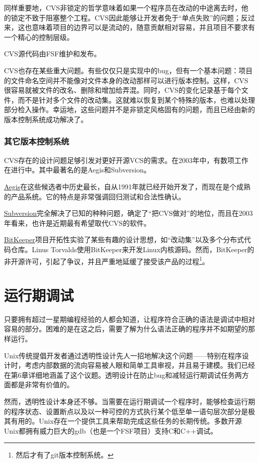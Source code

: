\documentclass[12pt,oneside]{ctexbook}
\begin{document}
\begin{common-format}
同样重要地，CVS非锁定的哲学意味着如果一个程序员在改动的中途离去时，他的锁定不致于阻塞整个工程。CVS因此能够让开发者免于“单点失败”的问题；反过来，这也意味着项目的边界可以是流动的，随意贡献相对容易，并且项目不要求有一个精心的控制层级。

CVS源代码由FSF维护和发布。

CVS也存在某些重大问题。有些仅仅只是实现中的bug，但有一个基本问题：项目的文件命名空间并不能像对文件本身的改动那样可以进行版本控制。这样，CVS很容易就被文件的改名、删除和增加给弄混。同时，CVS的变化记录基于每个文件，而不是针对多个文件的改动集。这就难以恢复到某个特殊的版本，也难以处理部分检入操作。幸运地，这些问题并不是非锁定风格固有的问题，而且已经由新的版本控制系统成功解决了。

\subsubsection{其它版本控制系统}
CVS存在的设计问题足够引发对更好开源VCS的需求。在2003年中，有数项工作在进行中。其中最著名的是Aegis和Subversion。

\href{http://www.pcug.org.au/~millerp/aegis/aegis.html}{Aegis}在这些候选者中历史最长，自从1991年就已经开始开发了，而现在是个成熟的产品系统。它的特点是非常强调回归测试和合法性确认。

\href{http://subversion.tigris.org/}{Subversion}完全解决了已知的种种问题，确定了“把CVS做对”的地位，而且在2003年看来，也许是近期最有希望取代CVS的软件。

\href{http://www.bitkeeper.com/}{BitKeeper}项目开拓性实验了某些有趣的设计思想，如“改动集”以及多个分布式代码仓库。Linus Torvalds使用BitKeeper来开发Linux内核源码。然而，BitKeeper的非开源许可，引起了争议，并且严重地延缓了接受该产品的过程\footnote{然后才有了git版本控制系统。}。

\section{运行期调试}
只要拥有超过一星期编程经验的人都会知道，让程序符合正确的语法是调试中相对容易的部分。困难的是在这之后，需要了解为什么语法正确的程序并不如期望的那样运行。

Unix传统提倡开发者通过透明性设计先人一招地解决这个问题——特别在程序设计时，考虑内部数据的流向容易被人眼和简单工具审视，并且易于建模。我们已经在第6章详细地涵盖了这个议题。透明设计在防止bug和减轻运行期调试任务两方面都是非常有价值的。

然而，透明性设计本身还不够。当需要在运行期调试一个程序时，能够检查运行期的程序状态、设置断点以及以一种可控的方式执行某个低至单一语句层次部分是极其有用的。Unix存在一个提供工具来帮助完成这些任务的长期传统。多数开源Unix都拥有威力巨大的gdb（也是一个FSF项目）支持C和C++调试。


\end{common-format}
\end{document}
